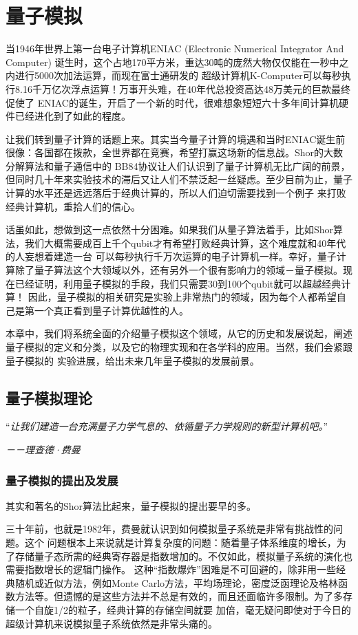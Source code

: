 ﻿
\chapter{量子模拟}
当1946年世界上第一台电子计算机ENIAC (Electronic Numerical Integrator And Computer) 诞生时，这个占地170平方米，重达30吨的庞然大物仅仅能在一秒中之内进行5000次加法运算，而现在富士通研发的
超级计算机K-Computer可以每秒执行8.16千万亿次浮点运算！万事开头难，在40年代总投资高达48万美元的巨款最终促使了
ENIAC的诞生，开启了一个新的时代，很难想象短短六十多年间计算机硬件已经进化到了如此的程度。

让我们转到量子计算的话题上来。其实当今量子计算的境遇和当时ENIAC诞生前很像：各国都在拨款，全世界都在竞赛，希望打赢这场新的信息战。Shor的大数分解算法和量子通信中的
BB84协议让人们认识到了量子计算机无比广阔的前景，但同时几十年来实验技术的滞后又让人们不禁泛起一丝疑虑。至少目前为止，量子计算的水平还是远远落后于经典计算的，所以人们迫切需要找到一个例子
来打败经典计算机，重拾人们的信心。

话虽如此，想做到这一点依然十分困难。如果我们从量子算法着手，比如Shor算法，我们大概需要成百上千个qubit才有希望打败经典计算，这个难度就和40年代的人妄想着建造一台
可以每秒执行千万次运算的电子计算机一样。幸好，量子计算除了量子算法这个大领域以外，还有另外一个很有影响力的领域－量子模拟。现在已经证明，利用量子模拟的手段，我们只需要30到100个qubit就可以超越经典计算！
因此，量子模拟的相关研究是实验上非常热门的领域，因为每个人都希望自己是第一个真正看到量子计算优越性的人。

本章中，我们将系统全面的介绍量子模拟这个领域，从它的历史和发展说起，阐述量子模拟的定义和分类，以及它的物理实现和在各学科的应用。当然，我们会紧跟量子模拟的
实验进展，给出未来几年量子模拟的发展前景。

\label{chap:simulation}
    \section{量子模拟理论}
    “\emph{让我们建造一台充满量子力学气息的、依循量子力学规则的新型计算机吧。}”

 \hspace{23em} \emph{－－理查德·费曼}

\subsection{量子模拟的提出及发展}

其实和著名的Shor算法比起来，量子模拟的提出要早的多。

三十年前，也就是1982年，费曼就认识到如何模拟量子系统是非常有挑战性的问题\cite{Feynman2}。这个
问题根本上来说就是计算复杂度的问题：随着量子体系维度的增长，为了存储量子态所需的经典寄存器是指数增加的。不仅如此，模拟量子系统的演化也需要指数增长的逻辑门操作。
这种“指数爆炸”困难是不可回避的，除非用一些经典随机或近似方法，例如Monte Carlo方法，平均场理论，密度泛函理论及格林函数方法等。但遗憾的是这些方法并不总是有效的，而且还面临许多限制。为了多存储一个自旋1/2的粒子，经典计算的存储空间就要
加倍，毫无疑问即使对于今日的超级计算机来说模拟量子系统依然是非常头痛的。

